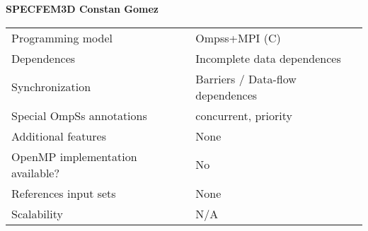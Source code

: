 \section*{}
\label{specfem3D_cgomez}
\centering
\Huge
\textbf{SPECFEM3D Constan Gomez}

\begin{table}[h!]
  \large
  \centering
  \begin{tabular}{|l|l|}
    \hline
    Programming model                & Ompss+MPI (C)\\
    Dependences                      & Incomplete data dependences \\
    Synchronization                  & Barriers / Data-flow dependences \\
    Special OmpSs annotations        & concurrent, priority\\
    Additional features              & None\\
    OpenMP implementation available? & No \\
    References input sets            & None \\
    Scalability                      & N/A \\
    \hline
  \end{tabular}
\end{table}

\newpage
